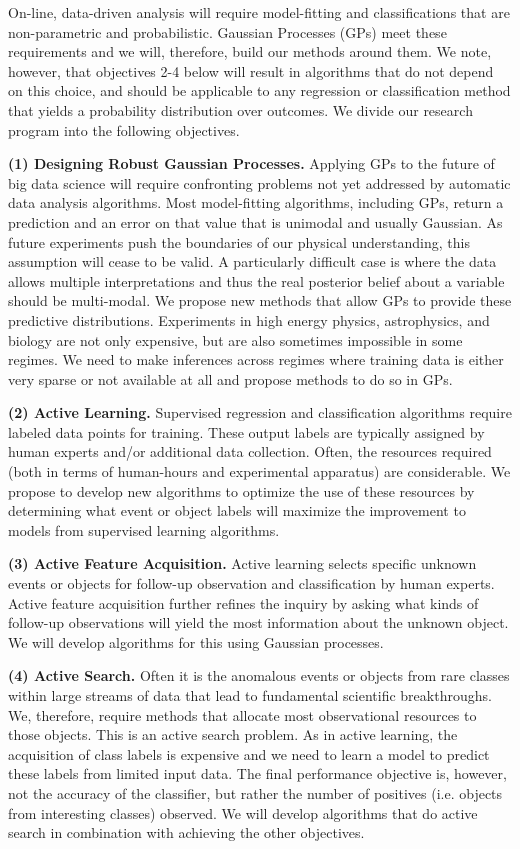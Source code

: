 \documentclass[prd,nofootbib,floatfix,11pt,tightenlines,nofootinbib]{revtex4}
\begin{document}
On-line, data-driven analysis will require model-fitting and
classifications that are non-parametric and probabilistic.  Gaussian
Processes (GPs) meet these requirements and we will, therefore, build our
methods around them.  We note, however, that objectives 2-4 below will result in
algorithms that do not depend on this choice, and should be applicable to
any regression or classification method that yields a probability
distribution over outcomes.  We divide our research program into the
following objectives.

{\bf (1) Designing Robust Gaussian Processes.}  Applying GPs to the future
of big data science will require confronting problems not yet addressed by
automatic data analysis algorithms. Most model-fitting algorithms,
including GPs, return a prediction and an error on that value that is
unimodal and usually Gaussian.  As future experiments push the boundaries
of our physical understanding, this assumption will cease to be valid.  A
particularly difficult case is where the data allows multiple
interpretations and thus the real posterior belief about a variable should
be multi-modal.  We propose new methods that allow GPs to provide these
predictive distributions.  Experiments in high energy physics,
astrophysics, and biology are not only expensive, but are also sometimes
impossible in some regimes.  We need to make inferences across regimes
where training data is either very sparse or not available at all and
propose methods to do so in GPs.

{\bf (2) Active Learning.} Supervised regression and classification
algorithms require labeled data points for training.  These output labels
are typically assigned by human experts and/or additional data
collection.  Often, the resources required (both in terms of human-hours
and experimental apparatus) are considerable.  We propose to develop new
algorithms to optimize the use of these resources by determining what event
or object labels will maximize the improvement to models from supervised
learning algorithms.

{\bf (3) Active Feature Acquisition.}  Active learning selects specific
unknown events or objects for follow-up observation and classification by
human experts.  Active feature acquisition further refines the inquiry by
asking what kinds of follow-up observations will yield the most information
about the unknown object.  We will develop algorithms for this using
Gaussian processes.

{\bf (4) Active Search.} Often it is the anomalous events or objects from
rare classes within large streams of data that lead to fundamental
scientific breakthroughs. We, therefore, require methods that allocate most
observational resources to those objects.  This is an active search
problem. As in active learning, the acquisition of class labels is
expensive and we need to learn a model to predict these labels from limited
input data. The final performance objective is, however, not the accuracy
of the classifier, but rather the number of positives (i.e. objects from
interesting classes) observed.  We will develop algorithms that do active
search in combination with achieving the other objectives.
\end{document}
